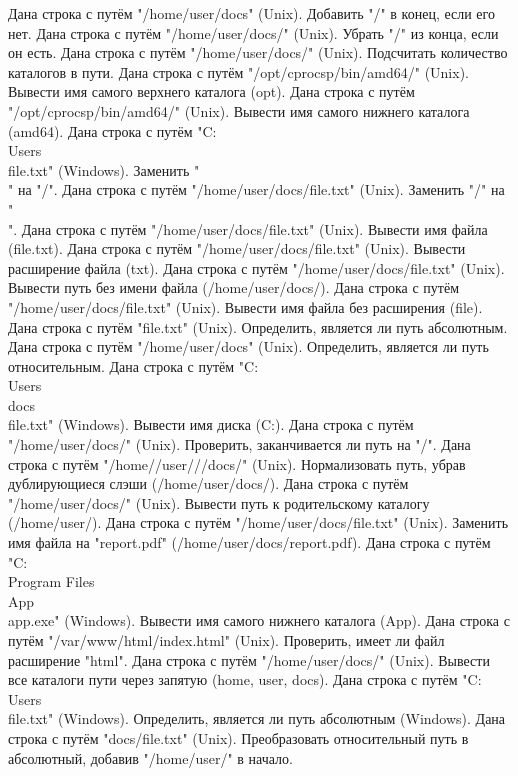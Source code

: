 Дана строка с путём "/home/user/docs" (Unix). Добавить "/" в конец, если его нет.
Дана строка с путём "/home/user/docs/" (Unix). Убрать "/" из конца, если он есть.
Дана строка с путём "/home/user/docs/" (Unix). Подсчитать количество каталогов в пути.
Дана строка с путём "/opt/cprocsp/bin/amd64/" (Unix). Вывести имя самого верхнего каталога (opt).
Дана строка с путём "/opt/cprocsp/bin/amd64/" (Unix). Вывести имя самого нижнего каталога (amd64).
Дана строка с путём "C:\\Users\\file.txt" (Windows). Заменить "\\" на "/".
Дана строка с путём "/home/user/docs/file.txt" (Unix). Заменить "/" на "\\".
Дана строка с путём "/home/user/docs/file.txt" (Unix). Вывести имя файла (file.txt).
Дана строка с путём "/home/user/docs/file.txt" (Unix). Вывести расширение файла (txt).
Дана строка с путём "/home/user/docs/file.txt" (Unix). Вывести путь без имени файла (/home/user/docs/).
Дана строка с путём "/home/user/docs/file.txt" (Unix). Вывести имя файла без расширения (file).
Дана строка с путём "file.txt" (Unix). Определить, является ли путь абсолютным.
Дана строка с путём "/home/user/docs" (Unix). Определить, является ли путь относительным.
Дана строка с путём "C:\\Users\\docs\\file.txt" (Windows). Вывести имя диска (C:).
Дана строка с путём "/home/user/docs/" (Unix). Проверить, заканчивается ли путь на "/".
Дана строка с путём "/home//user///docs/" (Unix). Нормализовать путь, убрав дублирующиеся слэши (/home/user/docs/).
Дана строка с путём "/home/user/docs/" (Unix). Вывести путь к родительскому каталогу (/home/user/).
Дана строка с путём "/home/user/docs/file.txt" (Unix). Заменить имя файла на "report.pdf" (/home/user/docs/report.pdf).
Дана строка с путём "C:\\Program Files\\App\\app.exe" (Windows). Вывести имя самого нижнего каталога (App).
Дана строка с путём "/var/www/html/index.html" (Unix). Проверить, имеет ли файл расширение "html".
Дана строка с путём "/home/user/docs/" (Unix). Вывести все каталоги пути через запятую (home, user, docs).
Дана строка с путём "C:\\Users\\file.txt" (Windows). Определить, является ли путь абсолютным (Windows).
Дана строка с путём "docs/file.txt" (Unix). Преобразовать относительный путь в абсолютный, добавив "/home/user/" в начало.
